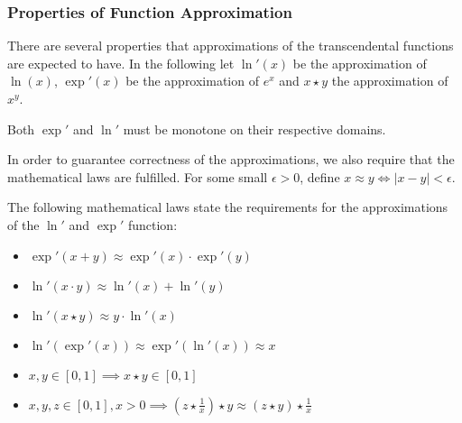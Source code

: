 \subsubsection{Properties of Function Approximation}
\label{sec:prop-funct-appr-1}

There are several properties that approximations of the transcendental functions
are expected to have. In the following let $\ln'(x)$ be the approximation of
$\ln(x)$, $\exp'(x)$ be the approximation of $e^{x}$ and $x\star y$ the approximation
of $x^{y}$.

\begin{property}
  \label{prop:monotone}
  Both $\exp'$ and $\ln'$ must be monotone on their respective domains.
\end{property}

In order to guarantee correctness of the approximations, we also require that
the mathematical laws are fulfilled. For some small $\epsilon > 0$, define
$x \approx y \Leftrightarrow \lvert x - y\rvert < \epsilon$.

\begin{property}
  \label{prop:ln-laws}
  The following mathematical laws state the requirements for the approximations
  of the $\ln'$ and $\exp'$ function:
  \begin{itemize}
  \item $\exp'(x + y) \approx \exp'(x) \cdot \exp'(y)$
  \item $\ln'(x\cdot y) \approx \ln'(x) + \ln'(y)$
  \item $\ln'(x\star y) \approx y\cdot \ln'(x)$
  \item $\ln'(\exp'(x)) \approx \exp'(\ln'(x)) \approx x$
  \item $x, y \in [0,1] \implies x \star y \in [0, 1]$
  \item $x, y, z \in [0,1], x > 0 \implies
    (z\star\frac{1}{x})\star y \approx (z\star y)\star\frac{1}{x}$
  \end{itemize}
\end{property}

